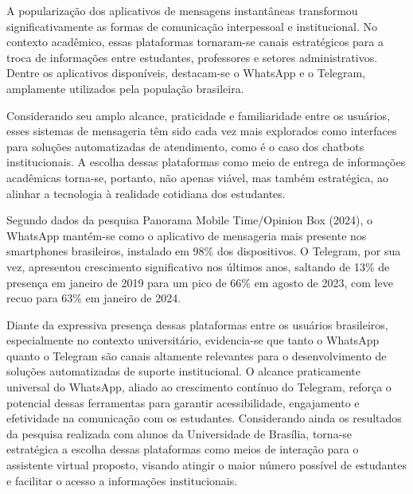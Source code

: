 A popularização dos aplicativos de mensagens instantâneas transformou significativamente as formas de comunicação interpessoal e institucional. No contexto acadêmico, essas plataformas tornaram-se canais estratégicos para a troca de informações entre estudantes, professores e setores administrativos. Dentre os aplicativos disponíveis, destacam-se o WhatsApp e o Telegram, amplamente utilizados pela população brasileira.

Considerando seu amplo alcance, praticidade e familiaridade entre os usuários, esses sistemas de mensageria têm sido cada vez mais explorados como interfaces para soluções automatizadas de atendimento, como é o caso dos chatbots institucionais. A escolha dessas plataformas como meio de entrega de informações acadêmicas torna-se, portanto, não apenas viável, mas também estratégica, ao alinhar a tecnologia à realidade cotidiana dos estudantes.

Segundo dados da pesquisa Panorama Mobile Time/Opinion Box (2024), o WhatsApp mantém-se como o aplicativo de mensageria mais presente nos smartphones brasileiros, instalado em 98\% dos dispositivos. O Telegram, por sua vez, apresentou crescimento significativo nos últimos anos, saltando de 13\% de presença em janeiro de 2019 para um pico de 66\% em agosto de 2023, com leve recuo para 63\% em janeiro de 2024.


Diante da expressiva presença dessas plataformas entre os usuários brasileiros, especialmente no contexto universitário, evidencia-se que tanto o WhatsApp quanto o Telegram são canais altamente relevantes para o desenvolvimento de soluções automatizadas de suporte institucional. O alcance praticamente universal do WhatsApp, aliado ao crescimento contínuo do Telegram, reforça o potencial dessas ferramentas para garantir acessibilidade, engajamento e efetividade na comunicação com os estudantes. Considerando ainda os resultados da pesquisa realizada com alunos da Universidade de Brasília, torna-se estratégica a escolha dessas plataformas como meios de interação para o assistente virtual proposto, visando atingir o maior número possível de estudantes e facilitar o acesso a informações institucionais.

